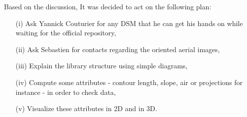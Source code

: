 \documentclass[a4paper, 11pt]{article}
\begin{document}
	Based on the discussion, It was decided to act on the following plan:
	\begin{itemize}
		\item[(i)] Ask Yannick Couturier for any DSM that he can get his hands on while waiting for the official repository,
		\item[(ii)] Ask Sebastien for contacts regarding the oriented aerial images,
		\item[(iii)] Explain the library structure using simple diagrams,
		\item[(iv)] Compute some attributes - contour length, slope, air or projections for instance - in order to check data,
		\item[(v)] Visualize these attributes in 2D and in 3D.
	\end{itemize}
\end{document}
